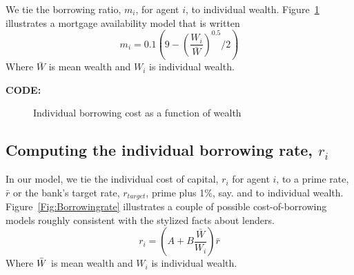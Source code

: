 We  tie the borrowing ratio, $m_i$,  for agent $i$, to individual wealth. Figure~\ref{Fig:Borrowingratio} illustrates a mortgage availability  model that is written 
 \[ m_i = 0.1(9-\left(\frac{W_i}{\bar W}\right)^{0.5}/2 )\]
Where $\bar{W}$ is mean wealth and $W_i$ is individual wealth. 




\textbf{CODE:}  

\begin{figure}
\caption{Individual borrowing cost as a function of wealth}
 \label{Fig:Borrowingratio}
\end{figure}



\subsection{Computing the individual borrowing rate, $r_i$}
In our model, we  tie the individual cost of capital,  $r_i$ for agent $i$, to a prime rate, $\bar r$ or the bank's target rate, $r_{target}$, prime plus 1\%, say. and to individual wealth. Figure~\ref{Fig:Borrowingrate} illustrates a couple of possible  cost-of-borrowing models roughly consistent  with the stylized facts about lenders. 
 \[ r_i = (A + B \frac{\bar{W}}{W_i})\bar r\]
Where $\Bar{W}$ is mean wealth and $W_i$ is individual wealth. 


